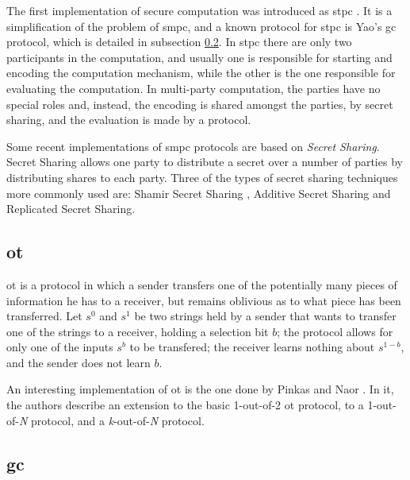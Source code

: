 The first implementation of secure computation was introduced as \ac{stpc} \cite{yao1982protocols}. It is a simplification of the problem of \ac{smpc}, and a known protocol for \ac{stpc} is Yao's \ac{gc} protocol, which is detailed in subsection \ref{ssec:GarbledCircuits}. In \ac{stpc} there are only two participants in the computation, and usually one is responsible for starting and encoding the computation mechanism, while the other is the one responsible for evaluating the computation. In multi-party computation, the parties have no special roles and, instead, the encoding is shared amongst the parties, by secret sharing, and the evaluation is made by a protocol. 

Some recent implementations of \ac{smpc} protocols are based on \textit{Secret Sharing}. Secret Sharing allows one party to distribute a secret over a number of parties by distributing shares to each party. Three of the types of secret sharing techniques more commonly used are: Shamir Secret Sharing \cite{shamir1979share}, Additive Secret Sharing and Replicated Secret Sharing.






\subsection{\acl{ot}}
\label{ssec:ObliviousTransfer}


\acf{ot} \cite{rabin2005exchange} is a protocol in which a sender transfers one of the potentially many pieces of information he has to a receiver, but remains oblivious as to what piece has been transferred. Let $s^0$ and $s^1$ be two strings held by a sender that wants to transfer one of the strings to a receiver, holding a selection bit $b$; the protocol allows for only one of the inputs $s^b$ to be transfered; the receiver learns nothing about $s^{1-b}$, and the sender does not learn $b$. 

An interesting implementation of \ac{ot} is the one done by Pinkas and Naor \cite{naor2005computationally}. In it, the authors describe an extension to the basic 1-out-of-2 \ac{ot} protocol, to a 1-out-of-\textit{N} protocol, and a \textit{k}-out-of-\textit{N} protocol.


\subsection{\acl{gc}} 
\label{ssec:GarbledCircuits}


